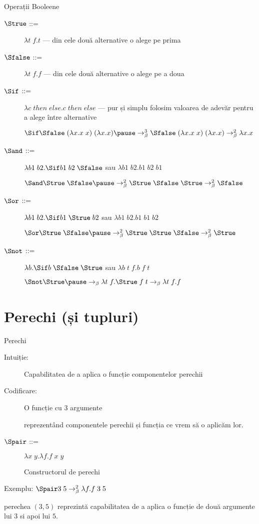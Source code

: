\documentclass[xcolor=pdftex,romanian,colorlinks]{beamer}
\begin{document}
\begin{frame}{Operații Booleene}
  \begin{description}
  \item[$\Strue$ ::=] $\lambda t\; f. t$
      --- din cele două alternative o alege pe prima
  \item[$\Sfalse$ ::=] $\lambda t\; f. f$
      --- din cele două alternative o alege pe a doua
  \item[$\Sif$ ::= ] $\lambda c\; then\; else. c\; then\; else$
  --- pur și simplu folosim valoarea de adevăr pentru a alege între alternative

  $\Sif \Sfalse\; (\lambda x.x\; x)\; (\lambda x.x) \pause \rightarrow^3_\beta
   \Sfalse\; (\lambda x.x\; x)\; (\lambda x.x) \rightarrow^2_\beta \lambda x.x$

  \item[$\Sand$ ::= ] $\lambda b1\; b2.\Sif b1\; b2\; \Sfalse$ sau  $\lambda b1\; b2.b1\; b2\; b1$

  $\Sand \Strue\; \Sfalse \pause \rightarrow^2_\beta \Strue\; \Sfalse\; \Strue \rightarrow^2_\beta \Sfalse$
  \item[$\Sor$ ::= ] $\lambda b1\; b2.\Sif b1\; \Strue\; b2$ sau  $\lambda b1\; b2.b1\; b1\; b2$

  $\Sor \Strue\; \Sfalse \pause \rightarrow^2_\beta \Strue\; \Strue\; \Sfalse \rightarrow^2_\beta \Strue$
  \item[$\Snot$ ::= ] $\lambda b.\Sif b\; \Sfalse\; \Strue$ sau $\lambda b\; t\; f.b\; f\; t$
  
  $\Snot \Strue \pause \rightarrow_\beta \lambda t\; f.\Strue\; f\; t \rightarrow_\beta \lambda t\; f.f$
  \end{description}
\end{frame}

\section{Perechi (și tupluri)}

\begin{frame}{Perechi}

  \begin{description}
    \item[Intuiție:] Capabilitatea de a aplica o funcție componentelor perechii
    \item[Codificare:] O funcție cu 3 argumente 
         
          reprezentând componentele perechii și funcția ce vrem să o aplicăm lor.
    \item[$\Spair$ ::=] $\lambda x\; y.\lambda f.f\; x\; y$

    Constructorul de perechi

  \end{description}
    \begin{block}{Exemplu: $\Spair 3\; 5 \rightarrow^2_\beta \lambda f.f\; 3\; 5$}
    
    perechea $(3,5)$
    reprezintă capabilitatea de a aplica o funcție de două argumente lui $3$ si apoi lui $5$.
    \end{block}
\end{frame}
\end{document}
